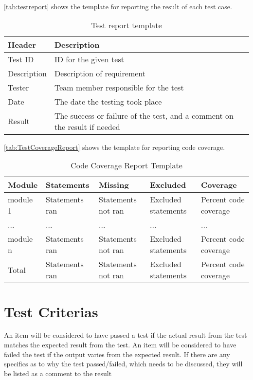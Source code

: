 \autoref{tab:testreport} shows the template for reporting the result of each test case.

\begin{table}[htb] \small \center
\caption{Test report template \label{tab:testreport}}
\begin{tabular}{l l}
	\toprule
	Header & Description \\
	\midrule
	Test ID & ID for the given test \\
	Description & Description of requirement \\
	Tester & Team member responsible for the test \\
	Date & The date the testing took place \\
	Result & The success or failure of the test, and a comment on the result if needed \\
	\bottomrule
\end{tabular}
\end{table}

\autoref{tab:TestCoverageReport} shows the template for reporting code coverage.

\begin{table}[!htb]\footnotesize\center
	\caption{Code Coverage Report Template\label{tab:TestCoverageReport}}
	\begin{tabular}{l l l l l}
		\toprule
		Module & Statements & Missing & Excluded & Coverage\\
		\midrule
		module 1 & Statements ran & Statements not ran  & Excluded statements & Percent code coverage\ \\
		... & ... & ... & ... & ... \\
		module n & Statements ran & Statements not ran & Excluded statements  & Percent code coverage \\
		\bottomrule
		Total & Statements ran & Statements not ran & Excluded statements & Percent code coverage \\
		\bottomrule
	\end{tabular}
\end{table}


\section{Test Criterias}
An item will be considered to have passed a test if the actual result from the test matches the expected result from the test. An item will be considered to have failed the test if the output varies from the expected result. If there are any specifics as to why the test passed/failed, which needs to be discussed, they will be listed as a comment to the result


